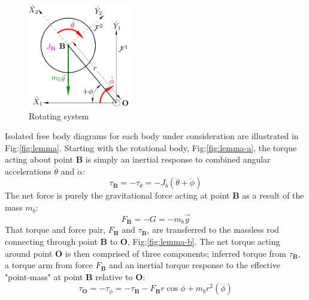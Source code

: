 \begin{figure}[htbp]
\centering
\includegraphics[width=0.4\textwidth]{figs/lemma-1}
\caption{Rotating system}
\label{fig:lemma-1}
\vspace{-18pt}
\end{figure} 
\par
Isolated free body diagrams for each body under consideration are illustrated in Fig:\ref{fig:lemma}. Starting with the rotational body, Fig:\ref{fig:lemma-a}, the torque acting about point $\mathbf{B}$ is simply an inertial response to combined angular accelerations $\ddot{\theta}$ and $\ddot{\alpha}$:
\begin{equation}
\tau_\mathbf{B}=-\tau_\theta=-J_b(\ddot{\theta}+\ddot{\phi})
\end{equation}
The net force is purely the gravitational force acting at point $\mathbf{B}$ as a result of the mass $m_b$:
\begin{equation}
F_\mathbf{B}=-G=-m_b\vec{g}
\end{equation}
That torque and force pair, $F_\mathbf{B}$ and $\tau_\mathbf{B}$, are transferred to the massless rod connecting through point $\mathbf{B}$ to $\mathbf{O}$, Fig:\ref{fig:lemma-b}. The net torque acting around point $\mathbf{O}$ is then comprised of three components; inferred torque from $\tau_\mathbf{B}$, a torque arm from force $F_\mathbf{B}$ and an inertial torque response to the effective "point-mass" at point $\mathbf{B}$ relative to $\mathbf{O}$:
\begin{equation}
\tau_\mathbf{O}=-\tau_\phi=-\tau_\mathbf{B}-F_\mathbf{B}r\cos{\phi}+m_br^2(\ddot{\phi})
\end{equation}
\par
